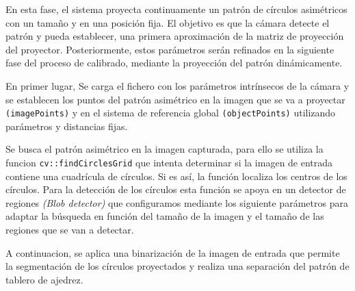 En esta fase, el sistema proyecta continuamente un patrón de círculos asimétricos con un tamaño y en una posición fija. El objetivo es que la cámara detecte el patrón y pueda establecer, una primera aproximación de la matriz de proyección del proyector. Posteriormente, estos parámetros serán refinados en la siguiente fase del proceso de calibrado, mediante la proyección del patrón dinámicamente.

En primer lugar, Se carga el fichero con los parámetros intrínsecos de la cámara y se establecen los puntos del patrón asimétrico en la imagen que se va a proyectar \texttt{(imagePoints)} y en el sistema de referencia global \texttt{(objectPoints)} utilizando parámetros y distancias fijas.  


Se busca el patrón asimétrico en la imagen capturada, para ello se utiliza la funcion \texttt{cv::findCirclesGrid} que intenta determinar si la imagen de entrada contiene una cuadrícula de círculos. Si es así, la función localiza los centros de los círculos. Para la detección de los círculos esta función se apoya en un detector de regiones \emph{(Blob detector)} que configuramos mediante los siguiente parámetros para adaptar la búsqueda en función del tamaño de la imagen y el tamaño de las regiones que se van a detectar.


A continuacion, se aplica una binarización de la imagen de entrada que permite la segmentación de los círculos proyectados y realiza una separación del patrón de tablero de ajedrez.

